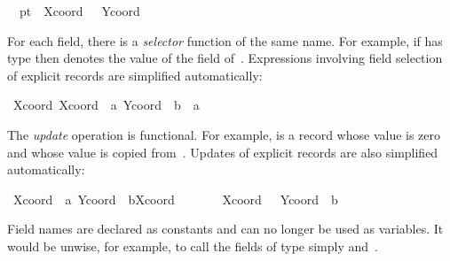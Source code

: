 \begin{isabellebody}
\ \ {\isachardoublequote}pt{}\ {\isasymequiv}\ {\isasymlparr}Xcoord\ {\isacharequal}\ {\isacharminus}{}{}{\isacharcomma}\ Ycoord\ {\isacharequal}\ {}{}{\isasymrparr}{\isachardoublequote}\isamarkupfalse%
%
\begin{isamarkuptext}%
For each field, there is a \emph{selector}
  function of the same name.  For example, if  has type  then  denotes the value of the  field of~.  Expressions involving field selection
  of explicit records are simplified automatically:%
\end{isamarkuptext}%
\isamarkuptrue%
\ {\isachardoublequote}Xcoord\ {\isasymlparr}Xcoord\ {\isacharequal}\ a{\isacharcomma}\ Ycoord\ {\isacharequal}\ b{\isasymrparr}\ {\isacharequal}\ a{\isachardoublequote}\isanewline
\ \ \isamarkupfalse%
\isamarkupfalse%
%
\begin{isamarkuptext}%
The \emph{update} operation is functional.  For
  example,  is a record whose 
  value is zero and whose  value is copied from~.  Updates of explicit records are also simplified automatically:%
\end{isamarkuptext}%
\isamarkuptrue%
\ {\isachardoublequote}{\isasymlparr}Xcoord\ {\isacharequal}\ a{\isacharcomma}\ Ycoord\ {\isacharequal}\ b{\isasymrparr}{\isasymlparr}Xcoord\ {\isacharcolon}{\isacharequal}\ {}{\isasymrparr}\ {\isacharequal}\isanewline
\ \ \ \ {\isasymlparr}Xcoord\ {\isacharequal}\ {}{\isacharcomma}\ Ycoord\ {\isacharequal}\ b{\isasymrparr}{\isachardoublequote}\isanewline
\ \ \isamarkupfalse%
\isamarkupfalse%
%
\begin{isamarkuptext}%
\begin{warn}
  Field names are declared as constants and can no longer be used as
  variables.  It would be unwise, for example, to call the fields of
  type  simply  and~.
  \end{warn}%
\end{isamarkuptext}%
\isamarkuptrue%
%
\isamarkuptrue%
%
\begin{isamarkuptext}%
%


\end{isamarkuptext}
\end{isabellebody}
